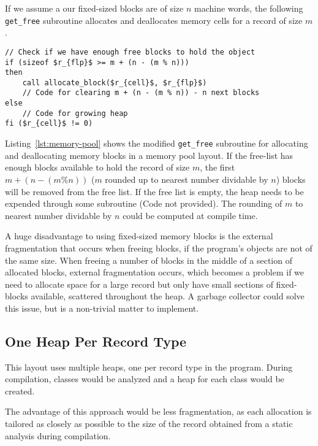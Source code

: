 If we assume a our fixed-sized blocks are of size $n$ machine words, the following \texttt{get\_free} subroutine allocates and deallocates memory cells for a record of size $m$.

\begin{lstlisting}[mathescape=true, caption={Allocating and deallocating records of size $m$ using block of a fixed size $n$. Code modified from~\cite{ha:heap}}, language=janus, style=basic,label={lst:memory-pool}]
// Check if we have enough free blocks to hold the object 
if (sizeof $r_{flp}$ >= m + (n - (m % n))) 
then
    call allocate_block($r_{cell}$, $r_{flp}$)
    // Code for clearing m + (n - (m % n)) - n next blocks 
else 
	// Code for growing heap
fi ($r_{cell}$ != 0)
\end{lstlisting}

Listing~\ref{lst:memory-pool} shows the modified \texttt{get\_free} subroutine for allocating and deallocating memory blocks in a memory pool layout. If the free-list has enough blocks available to hold the record of size $m$, the first $m + (n - (m \% n))$ ($m$ rounded up to nearest number dividable by $n$) blocks will be removed from the free list. If the free list is empty, the heap needs to be expended through some subroutine (Code not provided). The rounding of $m$ to nearest number dividable by $n$ could be computed at compile time.

A huge disadvantage to using fixed-sized memory blocks is the external fragmentation that occurs when freeing blocks, if the program's objects are not of the same size. When freeing a number of blocks in the middle of a section of allocated blocks, external fragmentation occurs, which becomes a problem if we need to allocate space for a large record but only have small sections of fixed-blocks available, scattered throughout the heap. A garbage collector could solve this issue, but is a non-trivial matter to implement.



\subsection{One Heap Per Record Type}
This layout uses multiple heaps, one per record type in the program. During compilation, classes would be analyzed and a heap for each class would be created. 

The advantage of this approach would be less fragmentation, as each allocation is tailored as closely as possible to the size of the record obtained from a static analysis during compilation.

